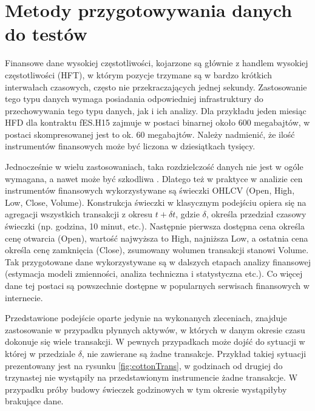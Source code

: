 \documentclass[a4paper,12pt,openany, DIV=calc, headsepline]{scrbook}
\begin{document}
\section{Metody przygotowywania danych do testów}

Finansowe dane wysokiej częstotliwości, kojarzone są głównie z handlem wysokiej częstotliwości (HFT), w którym pozycje trzymane są w bardzo krótkich interwałach czasowych, często nie przekraczających jednej sekundy. Zastosowanie tego typu danych wymaga posiadania odpowiedniej infrastruktury do przechowywania tego typu danych, jak i ich analizy. Dla przykładu jeden miesiąc HFD dla kontraktu fES.H15 zajmuje w postaci binarnej około 600 megabajtów, w postaci skompresowanej jest to ok. 60 megabajtów. Należy nadmienić, że ilość instrumentów finansowych może być liczona w dziesiątkach tysięcy.

Jednocześnie w wielu zastosowaniach, taka rozdzielczość danych nie jest w ogóle wymagana, a nawet może być szkodliwa \citep{doman2009modelowanie}. Dlatego też w praktyce w analizie cen instrumentów finansowych wykorzystywane są świeczki OHLCV (Open, High, Low, Close, Volume). Konstrukcja świeczki w klasycznym podejściu opiera się na agregacji wszystkich transakcji z okresu $t + \delta t$, gdzie $\delta$, określa przedział czasowy świeczki (np. godzina, 10 minut, etc.). Następnie pierwsza dostępna cena określa cenę otwarcia (Open), wartość najwyższa to High, najniższa Low, a ostatnia cena określa cenę zamknięcia (Close), zsumowany wolumen transakcji stanowi Volume. Tak przygotowane dane wykorzystywane są w dalszych etapach analizy finansowej (estymacja modeli zmienności, analiza techniczna i statystyczna etc.). Co więcej dane tej postaci są powszechnie dostępne w popularnych serwisach finansowych w internecie.

Przedstawione podejście oparte jedynie na wykonanych zleceniach, znajduje zastosowanie w przypadku płynnych aktywów, w których w danym okresie czasu dokonuje się wiele transakcji. W pewnych przypadkach może dojść do sytuacji w której w przedziale $\delta$, nie zawierane są żadne transakcje. Przykład takiej sytuacji prezentowany jest na rysunku \ref{fig:cottonTrans}, w godzinach od drugiej do trzynastej nie wystąpiły na przedstawionym instrumencie żadne transakcje. W przypadku próby budowy świeczek godzinowych w tym okresie wystąpiłyby brakujące dane.
\end{document}
